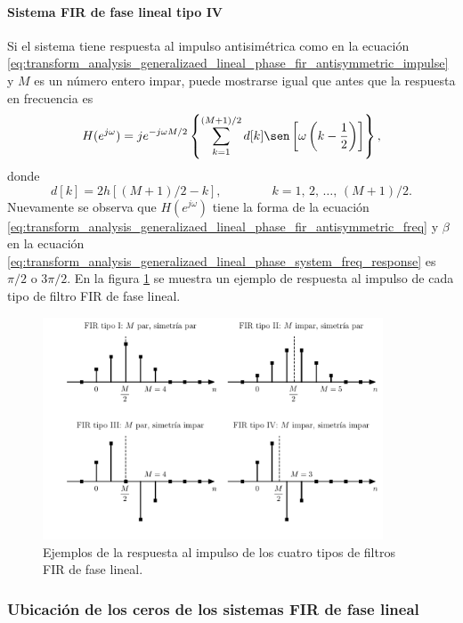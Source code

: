 \documentclass[a4paper]{report}
\begin{document}
\paragraph{Sistema FIR de fase lineal tipo IV} Si el sistema tiene respuesta al impulso antisimétrica como en la ecuación \ref{eq:transform_analysis_generalizaed_lineal_phase_fir_antisymmetric_impulse}
y \(M\) es un número entero impar, puede mostrarse igual que antes que la respuesta en frecuencia es
\[
 H(e^{j\omega})=je^{-j\omega M/2}\left\{\sum_{k=1}^{(M+1)/2}d[k]\sen\left[\omega\left(k-\frac{1}{2}\right)\right]\right\},
\]
donde
\[
 d[k]=2h[(M+1)/2-k],
 \qquad\qquad 
 k=1,\,2,\,\dots,\,(M+1)/2.
\]
Nuevamente se observa que \(H(e^{j\omega})\) tiene la forma de la ecuación \ref{eq:transform_analysis_generalizaed_lineal_phase_fir_antisymmetric_freq} y \(\beta\) en la ecuación \ref{eq:transform_analysis_generalizaed_lineal_phase_system_freq_response} es \(\pi/2\) o \(3\pi/2\). En la figura \ref{fig:transform_analysis_lineal_phase_fir_types} se muestra un ejemplo de respuesta al impulso de cada tipo de filtro FIR de fase lineal.
\begin{figure}[!htb]
 \begin{center}
 \includegraphics[width=0.9\textwidth]{figuras/transform_analysis_lineal_phase_fir_types.pdf}
 \caption{\label{fig:transform_analysis_lineal_phase_fir_types} Ejemplos de la respuesta al impulso de los cuatro tipos de filtros FIR de fase lineal.}
 \end{center}
\end{figure} 

\subsubsection{Ubicación de los ceros de los sistemas FIR de fase lineal}
\end{document}
